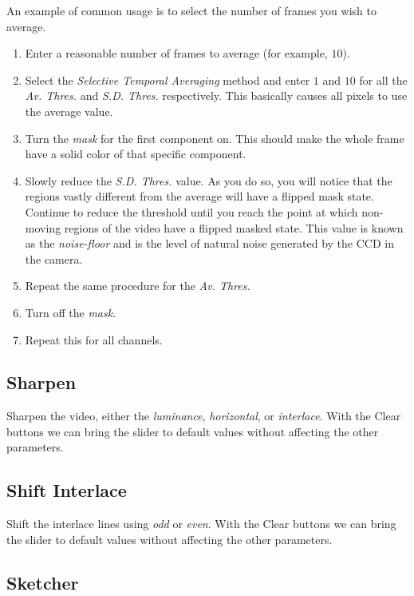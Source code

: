 An example of common usage is to select the number of frames you wish to average.

\begin{enumerate}
    \item Enter a reasonable number of frames to average (for example, $10$).
    \item Select the \textit{Selective Temporal Averaging} method and enter $1$ and $10$ for all the \textit{Av. Thres.} and \textit{S.D. Thres.} respectively. This basically causes all pixels to use the average value.
    \item Turn the \textit{mask} for the first component on. This should make the whole frame have a solid color of that specific component.
    \item Slowly reduce the \textit{S.D. Thres.} value. As you do so, you will notice that the regions vastly different from the average will have a flipped mask state. Continue to reduce the threshold until you reach the point at which non-moving regions of the video have a flipped masked state. This value is known as the \textit{noise-floor} and is the level of natural noise generated by the CCD in the camera.
    \item Repeat the same procedure for the \textit{Av. Thres.}
    \item Turn off the \textit{mask}.
    \item Repeat this for all channels.
\end{enumerate}

\subsection{Sharpen}%
\label{sub:Sharpen}

Sharpen the video, either the \textit{luminance}, \textit{horizontal}, or \textit{interlace}. With the Clear buttons we can bring the slider to default values without affecting the other parameters.

\subsection{Shift Interlace}%
\label{sub:shift_interlace}

Shift the interlace lines using \textit{odd} or \textit{even}. With the Clear buttons we can bring the slider to default values without affecting the other parameters.

\subsection{Sketcher}%
\label{sub:Sketcher}

